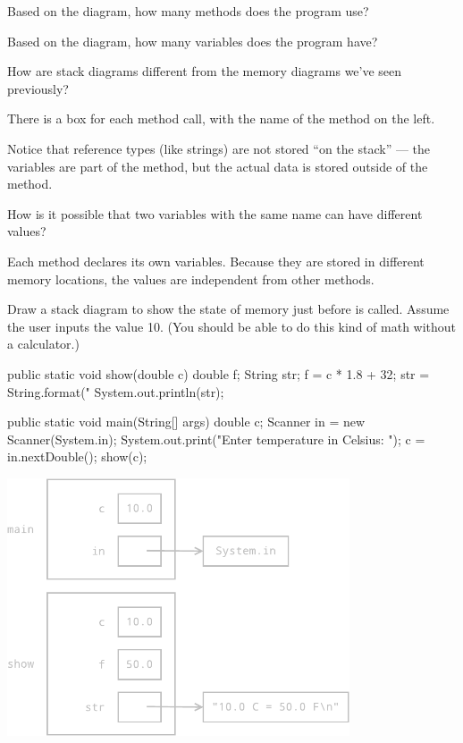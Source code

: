 

\Q Based on the diagram, how many methods does the program use? 
\vspace{1ex}


\Q Based on the diagram, how many variables does the program have? 
\vspace{1ex}


\Q How are stack diagrams different from the memory diagrams we've seen previously?

\begin{answer}[5em]
There is a box for each method call, with the name of the method on the left.

\medskip
Notice that reference types (like strings) are not stored ``on the stack'' --- the variables are part of the method, but the actual data is stored outside of the method.
\end{answer}


\Q How is it possible that two variables with the same name can have different values?

\begin{answer}[3em]
Each method declares its own variables.
Because they are stored in different memory locations, the values are independent from other methods.
\end{answer}


\Q \label{drawing}
Draw a stack diagram to show the state of memory just before  is called.
Assume the user inputs the value 10.
(You should be able to do this kind of math without a calculator.)

\vspace{1ex}
\begin{javalst}
    public static void show(double c) {
        double f;
        String str;
        f = c * 1.8 + 32;
        str = String.format("%
        System.out.println(str);
    }

    public static void main(String[] args) {
        double c;
        Scanner in = new Scanner(System.in);
        System.out.print("Enter temperature in Celsius: ");
        c = in.nextDouble();
        show(c);
    }
\end{javalst}
\vspace{-1ex}

\begin{answer}[3in]
\hfill
\includegraphics[height=3in]{stack2.pdf}
\end{answer}


